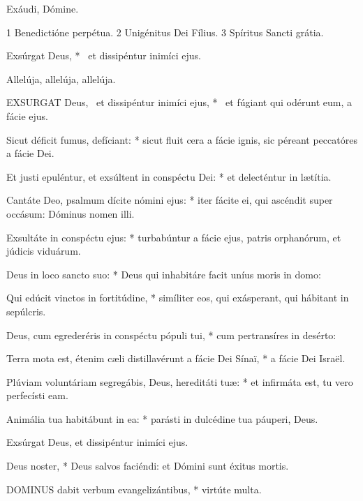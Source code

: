  Exáudi, Dómine.

 1 Benedictióne perpétua. 2 Unigénitus Dei Fílius. 3 Spíritus Sancti grátia.



 Exsúrgat Deus, * \textdagger\ et dissipéntur inimíci ejus. \textdaggerdbl


 Allelúja, allelúja, allelúja.


\lettrine[lines=2]{E}{XSURGAT} Deus, \textdagger\ et dissipéntur inimíci ejus, * \textdaggerdbl\ et fúgiant qui odérunt eum, a fácie ejus.

Sicut déficit fumus, defíciant: * sicut fluit cera a fácie ignis, sic péreant peccatóres a fácie Dei.

Et justi epuléntur, et exsúltent in conspéctu Dei: * et delecténtur in lætítia.

Cantáte Deo, psalmum dícite nómini ejus: * iter fácite ei, qui ascéndit super occásum: Dóminus nomen illi.

Exsultáte in conspéctu ejus: * turbabúntur a fácie ejus, patris orphanórum, et júdicis viduárum.

Deus in loco sancto suo: * Deus qui inhabitáre facit uníus moris in domo:

Qui edúcit vinctos in fortitúdine, * simíliter eos, qui exásperant, qui hábitant in sepúlcris.

Deus, cum egrederéris in conspéctu pópuli tui, * cum pertransíres in desérto:

Terra mota est, étenim cæli distillavérunt a fácie Dei Sínaï, * a fácie Dei Israël.

Plúviam voluntáriam segregábis, Deus, hereditáti tuæ: * et infirmáta est, tu vero perfecísti eam.

Animália tua habitábunt in ea: * parásti in dulcédine tua páuperi, Deus.

 Exsúrgat Deus, et dissipéntur inimíci ejus.

 Deus noster, * Deus salvos faciéndi: et Dómini sunt éxitus mortis.


\lettrine[lines=2]{D}{OMINUS} dabit verbum evangelizántibus, * virtúte multa.


